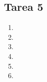 \documentclass{report}
\begin{document}
	

	\begin{center}
		{\let\newpage\relax\chapter*{Tarea 5}}
	\end{center}


    \begin{enumerate}%
        \item 
        
        \item 
        
        \item 
        
        \item 
        
        \item 
        
        \item 
    \end{enumerate}
    \newpage
    
  
\end{document}

